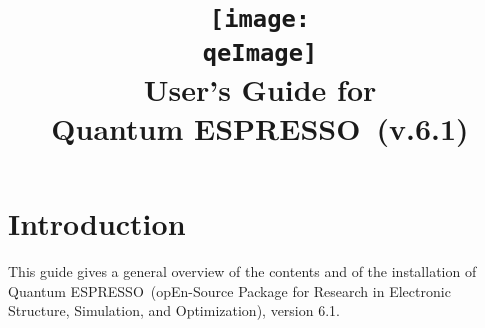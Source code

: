 \documentclass[12pt,a4paper]{article}
\def\version{6.1}
\def\qe{{\sc Quantum ESPRESSO}}
\begin{document}
\author{}
\date{}

\def\qeImage{quantum_espresso.pdf}

\title{
  \texttt{[image: \\qeImage]} \\
  \Huge User's Guide for \\ \qe\ (v.\version)
}

\maketitle

\tableofcontents

\section{Introduction}

This guide gives a general overview of the contents and of the installation
of \qe\ (opEn-Source Package for Research in Electronic Structure, Simulation,
and Optimization), version \version.
\end{document}

